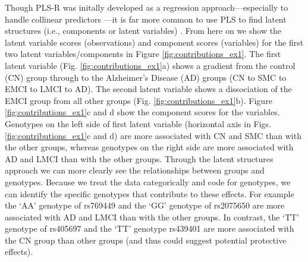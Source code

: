 \documentclass[12pt]{article}
\begin{document}
Though PLS-R was initally developed as a regression
approach---especially to handle collinear predictors \citep[see
explanations in][]{wold_collinearity_1984}---it is far more common to
use PLS to find latent structures (i.e., components or latent variables)
\citep{abdi_partial_2010-1}. From here on we show the latent variable
scores (observations) and component scores (variables) for the first two
latent variables/components in Figure \ref{fig:contributions_ex1}. The
first latent variable (Fig. \ref{fig:contributions_ex1}a) shows a
gradient from the control (CN) group through to the Alzheimer's Disease
(AD) groups (CN to SMC to EMCI to LMCI to AD). The second latent
variable shows a dissociation of the EMCI group from all other groups
(Fig. \ref{fig:contributions_ex1}b). Figure \ref{fig:contributions_ex1}c
and d show the component scores for the variables. Genotypes on the left
side of first latent variable (horizontal axis in Figs.
\ref{fig:contributions_ex1}c and d) are more associated with CN and SMC
than with the other groups, whereas genotypes on the right side are more
associated with AD and LMCI than with the other groups. Through the
latent structures approach we can more clearly see the relationships
between groups and genotypes. Because we treat the data categorically
and code for genotypes, we can identify the specific genotypes that
contribute to these effects. For example the `AA' genotype of rs769449
and the `GG' genotype of rs2075650 are more associated with AD and LMCI
than with the other groups. In contrast, the `TT' genotype of rs405697
and the `TT' genotype rs439401 are more associated with the CN group
than other groups (and thus could suggest potential protective effects).
\end{document}
